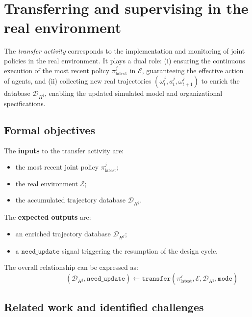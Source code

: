 \clearpage
\thispagestyle{empty}
\null
\newpage

\chapter{Transferring and supervising in the real environment}
\label{chap:transferring}

The \textit{transfer activity} corresponds to the implementation and monitoring of joint policies in the real environment.
It plays a dual role: (i) ensuring the continuous execution of the most recent policy $\pi^j_{\text{latest}}$ in $\mathcal{E}$, guaranteeing the effective action of agents, and (ii) collecting new real trajectories $(\omega^j_t, a^j_t, \omega^j_{t+1})$ to enrich the database $\mathcal{D}_{H^j}$, enabling the updated simulated model and organizational specifications.

\section*{Formal objectives}

The \textbf{inputs} to the transfer activity are:
\begin{itemize}
  \item the most recent joint policy $\pi^j_{\text{latest}}$;
  \item the real environment $\mathcal{E}$;
  \item the accumulated trajectory database $\mathcal{D}_{H^j}$.
\end{itemize}

\noindent
The \textbf{expected outputs} are:
\begin{itemize}
  \item an enriched trajectory database $\mathcal{D}_{H^j}$;
  \item a $\texttt{need\_update}$ signal triggering the resumption of the design cycle.
\end{itemize}

The overall relationship can be expressed as:
\[
  \hspace{3cm}(\mathcal{D}_{H^j}, \texttt{need\_update}) \gets \texttt{transfer}(\pi^j_{\text{latest}}, \mathcal{E}, \mathcal{D}_{H^j}, \texttt{mode})
\]

\section{Related work and identified challenges}

